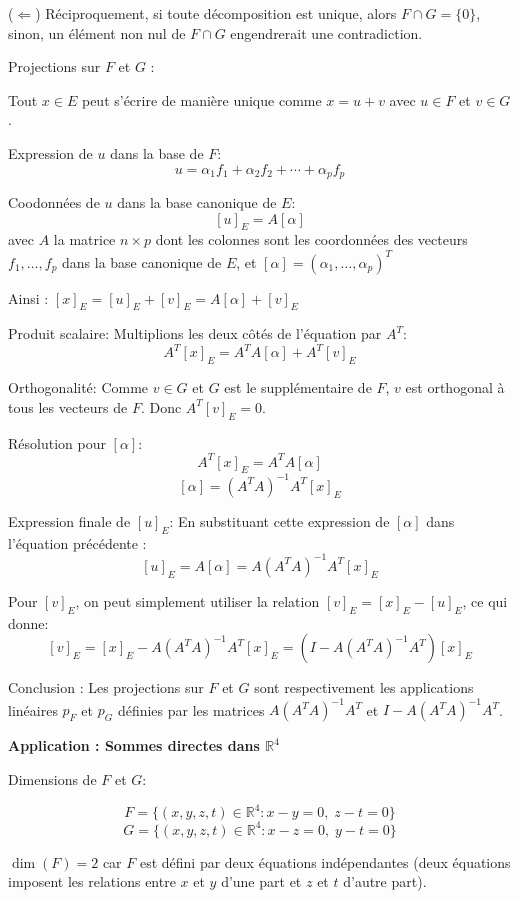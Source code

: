 \documentclass[10pt,a4paper]{article}
\begin{document}
($\Leftarrow$) Réciproquement, si toute décomposition est unique, alors $F \cap G = \{0\}$, sinon,
un élément non nul de $F \cap G$ engendrerait une contradiction.

\q Projections sur $F$ et $G$ :

Tout $x \in E$ peut s'écrire de manière unique comme $x = u + v$ avec $u \in F$ et $v \in G$.

Expression de $u$ dans la base de $F$:
\[u = \alpha_1 f_1 + \alpha_2 f_2 + \cdots + \alpha_p f_p\]

Coodonnées de \(u\) dans la base canonique de \(E\):
\[[u]_E = A[\alpha]\]
avec \(A\) la matrice \(n \times p\) dont les colonnes sont les coordonnées des vecteurs \(f_1, \ldots, f_p\)
dans la base canonique de \(E\), et \([\alpha] = (\alpha_1, \ldots, \alpha_p)^T\)

Ainsi : \([x]_E = [u]_E + [v]_E = A[\alpha] + [v]_E\)

Produit scalaire: Multiplions les deux côtés de l'équation par \(A^T\):
\[A^T[x]_E = A^T A[\alpha] + A^T[v]_E\]

Orthogonalité: Comme \(v \in G\) et \(G\) est le supplémentaire de \(F\), \(v\) est orthogonal à tous les
vecteurs de \(F\). Donc \(A^T[v]_E = 0\).

Résolution pour \([\alpha]\):
\[A^T[x]_E = A^T A[\alpha]\]
\[[\alpha] = (A^T A)^{-1}A^T[x]_E\]

Expression finale de \([u]_E\): En substituant cette expression de \([\alpha]\) dans l'équation
précédente :
\[ [u]_E = A[\alpha] = A(A^T A)^{-1}A^T[x]_E \]

Pour \([v]_E\), on peut simplement utiliser la relation \([v]_E = [x]_E - [u]_E\), ce qui donne:
\[
[v]_E = [x]_E - A(A^T A)^{-1}A^T[x]_E = (I - A(A^T A)^{-1}A^T)[x]_E
\]

Conclusion : Les projections sur \(F\) et \(G\) sont respectivement les applications linéaires \(p_F\) et
\(p_G\) définies par les matrices \(A(A^T A)^{-1}A^T\) et \(I - A(A^T A)^{-1}A^T\).

\bigskip
\textbf{Application : Sommes directes dans $\mathbb{R}^4$}

\q Dimensions de \(F\) et \(G\):

\[ F = \{ (x, y, z, t) \in \mathbb{R}^4 : x - y = 0, \; z - t = 0 \} \]
\[ G = \{ (x, y, z, t) \in \mathbb{R}^4 : x - z = 0, \; y - t = 0 \} \]

\( \dim(F) = 2 \) car $F$ est défini par deux équations indépendantes (deux équations imposent les relations entre $x$ et
$y$ d'une part et $z$ et $t$ d'autre part).
\end{document}
